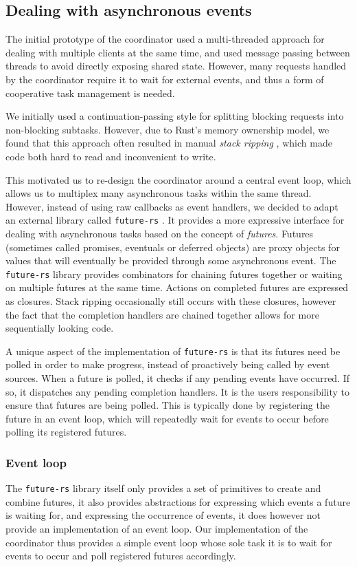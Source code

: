 \subsection{Dealing with asynchronous events}
The initial prototype of the coordinator used a multi-threaded approach for dealing
with multiple clients at the same time, and used message passing between threads
to avoid directly exposing shared state. However, many requests handled by
the coordinator require it to wait for external events, and thus a form of
cooperative task management is needed.

We initially used a continuation-passing style for splitting blocking requests into
non-blocking subtasks. However, due to Rust's memory ownership model, we found that
this approach often resulted in manual \emph{stack ripping} \cite{stackmgmt},
which made code both hard to read and inconvenient to write.

This motivated us to re-design the coordinator around a central event loop, which
allows us to multiplex many asynchronous tasks within the same thread. However,
instead of using raw callbacks as event handlers, we decided to adapt an external
library called \lstinline{future-rs} \cite{futuresrs}. It provides a more expressive interface
for dealing with asynchronous tasks based on the concept of \emph{futures}. Futures
(sometimes called promises, eventuals or deferred objects) are proxy objects for
values that will eventually be provided through some asynchronous event.
The \lstinline{future-rs} library provides combinators for chaining futures
together or waiting on multiple futures at the same time. Actions on completed
futures are expressed as closures. Stack ripping occasionally still occurs
with these closures, however the fact that the completion handlers are chained together
allows for more sequentially looking code.

A unique aspect of the implementation of \lstinline{future-rs} is that its futures
need be polled in order to make progress, instead of proactively being called
by event sources. When a future is polled, it checks if any pending events
have occurred. If so, it dispatches any pending completion handlers. 
It is the users responsibility to ensure that futures are being
polled. This is typically done by registering the future in an event loop,
which will repeatedly wait for events to occur before polling its registered
futures.

\subsubsection{Event loop}
The \lstinline{future-rs} library itself only provides a set of primitives to
create and combine futures, it also provides abstractions for expressing which
events a future is waiting for, and expressing the occurrence of events, it
does however not provide an implementation of an event loop. Our implementation
of the coordinator thus provides a simple event loop whose sole task it is
to wait for events to occur and poll registered futures accordingly.

